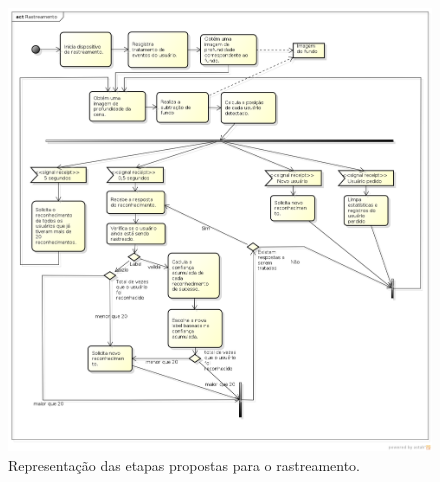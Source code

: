 	
	\begin{figure}[H]
		\begin{center}
			\includegraphics[scale=0.45]{figuras/4.ProblemaEProposta/diagrama-rastreamento.png}
		\end{center}
		\caption{Representação das etapas propostas para o rastreamento.}
		\label{fig:processo-rastreamento}
	\end{figure}
